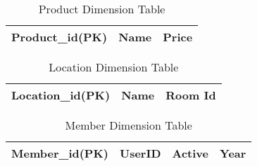 \begin{table}[H]
    \centering
    \begin{tabular}{|l|l|l|}
        \hline
        Product_id(PK) & Name & Price \\ \hline
    \end{tabular}
    \caption{Product Dimension Table}
    \label{tab:productDimensionTable}
\end{table}

\begin{table}[H]
    \centering
    \begin{tabular}{|l|l|l|}
        \hline
        Location_id(PK) & Name & Room Id \\ \hline
    \end{tabular}
    \caption{Location Dimension Table}
    \label{tab:locationDimensionTable}
\end{table}

\begin{table}[H]
    \centering
    \begin{tabular}{|l|l|l|l|}
        \hline
        Member_id(PK) & UserID & Active & Year \\ \hline
    \end{tabular}
    \caption{Member Dimension Table}
    \label{tab:memberDimensionTable}
\end{table}
